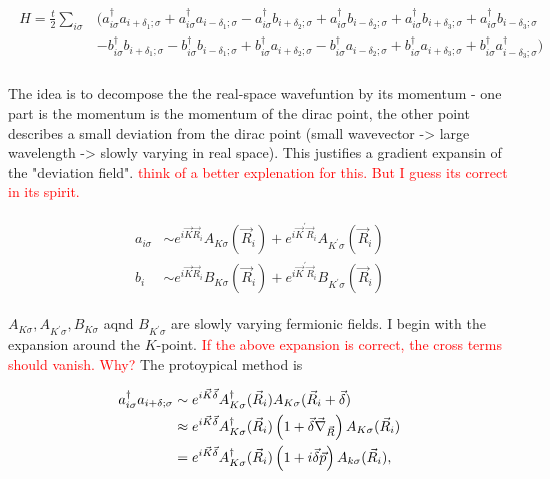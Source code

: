 \documentclass[../../../main.tex]{subfiles}
\begin{document}
\begin{align}
	\begin{split}
		H = \frac{t}{2} \sum_{i \sigma} &\bigg( a_{i\sigma}^\dagger a_{i+\delta_1;\sigma} + a_{i\sigma}^\dagger a_{i-\delta_1;\sigma} - a_{i\sigma}^\dagger b_{i+\delta_2;\sigma} + a_{i\sigma}^\dagger b_{i-\delta_2;\sigma} + a_{i\sigma}^\dagger b_{i+\delta_3;\sigma} + a_{i\sigma}^\dagger b_{i-\delta_3;\sigma} \\
		&-b_{i\sigma}^\dagger b_{i+\delta_1;\sigma} - b_{i\sigma}^\dagger b_{i-\delta_1;\sigma} + b_{i\sigma}^\dagger a_{i+\delta_2;\sigma} - b_{i\sigma}^\dagger a_{i-\delta_2;\sigma} + b_{i\sigma}^\dagger a_{i+\delta_3;\sigma} + b_{i\sigma}^\dagger a_{i-\delta_3;\sigma}^\dagger \bigg)  \\
	\end{split}
\end{align}

The idea is to decompose the the real-space wavefuntion by its momentum - one part is the momentum is the momentum of the dirac point, the other point describes a small deviation from the dirac point (small wavevector -> large wavelength -> slowly varying in real space). This justifies a gradient expansin of the "deviation field". \textcolor{red}{think of a better explenation for this. But I guess its correct in its spirit.}


\begin{align}
	\begin{split}
		a_{i\sigma} &\sim e^{i\vec{K}\vec{R}_i} A_{K\sigma}(\vec{R}_i) + e^{i\vec{K}^\prime\vec{R}_i} A_{K^\prime\sigma} (\vec{R}_i) \\
		b_i &\sim e^{i\vec{K}\vec{R}_i} B_{K\sigma}(\vec{R}_i) + e^{i\vec{K}^\prime\vec{R}_i} B_{K^\prime\sigma} (\vec{R}_i)
	\end{split}
\end{align}

$A_{K\sigma}, A_{K^\prime\sigma}, B_{K\sigma}$ aqnd $ B_{K^\prime\sigma}$ are slowly varying fermionic fields. I begin with the expansion around the $K$-point. \textcolor{red}{If the above expansion is correct, the cross terms should vanish. Why?} The protoypical method is 

\begin{align}
	a_{i\sigma}^\dagger a_{i+\delta;\sigma} &\sim e^{i\vec{K}\vec{\delta}}A^\dagger_{K\sigma}(\vec{R}_i)A_{K\sigma}(\vec{R}_i + \vec{\delta}) \notag \\
	&\approx e^{i\vec{K}\vec{\delta}} A^\dagger_{K\sigma}(\vec{R}_i)\left(1+\vec{\delta}\vec{\nabla}_{\vec{R}}\right)A_{K\sigma}(\vec{R}_i) \notag \\
	&= e^{i\vec{K}\vec{\delta}} A^\dagger_{K\sigma}(\vec{R}_i)\left(1+i\vec{\delta}\vec{p}\right)A_{k\sigma}(\vec{R}_i),
\end{align}
\end{document}

